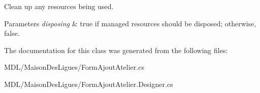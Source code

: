 Clean up any resources being used. 


\begin{DoxyParams}{Parameters}
{\em disposing} & true if managed resources should be disposed; otherwise, false.\\
\hline
\end{DoxyParams}


The documentation for this class was generated from the following files\+:\begin{DoxyCompactItemize}
\item 
M\+D\+L/\+Maison\+Des\+Ligues/Form\+Ajout\+Atelier.\+cs\item 
M\+D\+L/\+Maison\+Des\+Ligues/Form\+Ajout\+Atelier.\+Designer.\+cs\end{DoxyCompactItemize}
